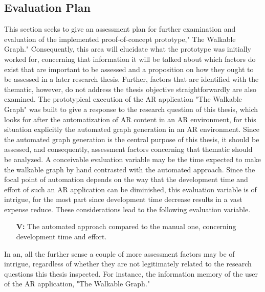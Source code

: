 \documentclass[12pt,a4paper,oneside,american,parskip=half]{article}
\begin{document}
\begin{justify}
\begin{normalsize}
\clearpage
\section{Evaluation Plan}
This section seeks to give an assessment plan for further examination and evaluation of the implemented proof-­of-­concept prototype," The Walkable Graph." Consequently, this area will elucidate what the prototype was initially worked for, concerning that information it will be talked about which factors do exist that are important to be assessed and a proposition on how they ought to be assessed in a later research thesis. Further, factors that are identified with the thematic, however, do not address the thesis objective straightforwardly are also examined.
\newline
The prototypical execution of the AR application "The Walkable Graph" was built to give a response to the research question of this thesis, which looks for after the automatization of AR content in an AR environment, for this situation explicitly the automated graph generation in an AR environment.
Since the automated graph generation is the central purpose of this thesis, it should be assessed, and consequently, assessment factors concerning that thematic should be analyzed.
\newline
A conceivable evaluation variable may be the time expected to make the walkable graph by hand contrasted with the automated approach. Since the focal point of automation depends on the way that the development time and effort of such an AR application can be diminished, this evaluation variable is of intrigue, for the most part since development time decrease results in a vast expense reduce.
\newline
These considerations lead to the following evaluation variable.
\begin{itemize}[leftmargin=2cm]
    \item [\textbf{V:}] The automated approach compared to the manual one, concerning development time and effort.
\end{itemize}
In an, all the further sense a couple of more assessment factors may be of intrigue, regardless of whether they are not legitimately related to the research questions this thesis inspected. For instance, the information memory of the user of the AR application, "The Walkable Graph." 
\newline

\end{normalsize}
\end{justify}
\end{document}
